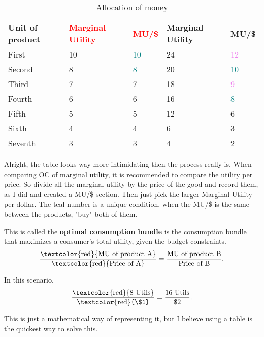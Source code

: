\begin{table}[!h]
    \begin{center}
        \begin{tabular}{l|l|l|l|l}
            \toprule
            Unit of product & \textcolor{red}{Marginal Utility} & \textcolor{red}{MU/\$} & Marginal Utility & MU/\$ \\
            \midrule
            First & 10 & \textcolor{teal}{10} & 24 & \textcolor{violet}{12}\\
            Second & 8 & \textcolor{teal}{8} & 20 & \textcolor{teal}{10} \\
        Third & 7 & 7 & 18 & \textcolor{violet}{9} \\
            Fourth & 6 & 6 & 16 & \textcolor{teal}{8} \\
            Fifth & 5 & 5 & 12 & 6 \\
            Sixth & 4 & 4 & 6 & 3 \\
            Seventh & 3 & 3 & 4 & 2 \\
            \bottomrule
        \end{tabular}
        \caption{Allocation of money}
        \label{tab:incomeallocation}
    \end{center}
\end{table}

Alright, the table looks way more intimidating then the process really is. When comparing OC of marginal utility, it is recommended to compare the utility per price. So divide all the marginal utility by the price of the good and record them, as I did and created a MU/\$ section. Then just pick the larger Marginal Utility per dollar. The teal number is a unique condition, when the MU/\$ is the same between the products, "buy" both of them.

This is called the \textbf{optimal consumption bundle} is the consumption bundle that maximizes a consumer's total utility, given the budget constraints. 
\[
    \frac{\text{\textcolor{red}{MU of product A}}}{\text{\textcolor{red}{Price of A}}} = \frac{\text{MU of product B}}{\text{Price of B}}
.\] 

In this scenario, 
\[
    \frac{\text{\textcolor{red}{8 Utils}}}{\text{\textcolor{red}{\$1}}} = \frac{\text{16 Utils}}{\text{\$2}}
.\]

This is just a mathematical way of representing it, but I believe using a table is the quickest way to solve this. 
